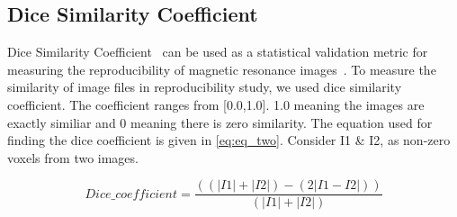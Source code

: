 \subsection{Dice Similarity Coefficient}
Dice Similarity Coefficient~\cite{ECY:ECY1945263297} can be used as a statistical validation metric for measuring the reproducibility of magnetic resonance images~\cite{Zou2004}. To measure the similarity of image files in reproducibility study, we used dice similarity coefficient. The coefficient ranges from [0.0,1.0]. 1.0 meaning the images are exactly similiar and 0 meaning there is zero similarity. The equation used for finding the dice coefficient is given in \ref{eq:eq_two}. Consider I1 \& I2, as non-zero voxels from two images.

\begin{equation}
  \label{eq:eq_two}
    Dice\_coefficient = \frac{((|I1| + |I2|) - (2|I1 - I2|))}{(|I1| + |I2|)}
\end{equation}

\iffalse
\DontPrintSemicolon
\SetKwFunction{FMain}{Convert\_image}
\SetKwProg{Fn}{Function}{:}{}
\Fn{\FMain{$image$}}{
  \begin{algorithmic}[1]
    \IF{image extension is ``.mgz":}
      \STATE convert image to ``.nii"
    \ELSE
      \STATE do nothing
    \ENDIF
  \end{algorithmic}
\KwRet image\;
}
\hfill \break
\hfill \break
\SetKwFunction{FDice}{Get\_NRMSE}
\SetKwProg{Pn}{Function}{:}{}
\Pn{\FDice{$image\-1$,$image\-2$}}{
  \begin{algorithmic}[1]
    \STATE image\_1 $\leftarrow$ Convert\_image(image\-1);
    \STATE image\_2 $\leftarrow$ Convert\_image(image\-2);
    \STATE \textbf{fslmaths} image\_1 \text{-sub} image\_2 $\rightarrow$ diff;
    \STATE nonzero\_voxels\_image1 $\leftarrow$ get the $\textless$non-zero voxels$\textgreater$ $\textless$volume$\textgreater$ from image\_1; \COMMENT{using FSL}
    \STATE nonzero\_voxels\_image2 $\leftarrow$ get the $\textless$non-zero voxels$\textgreater$ $\textless$volume$\textgreater$ from image\_2;
    \STATE nonzero\_voxels\_difference $\leftarrow$ get the $\textless$non-zero voxels$\textgreater$ $\textless$volume$\textgreater$ from difference of images;
    \STATE \textbf{Dice\_coeff} $\leftarrow$ $\frac{(nonzero\_voxels\_image1+nonzero\_voxels\_image2)-nonzero\_voxels\_difference}{(nonzero\_voxels\_image1+nonzero\_voxels\_image2)}$;
  \end{algorithmic}
\KwRet \textbf{Dice\_coeff}\;
}
\caption*{Algorithm 2: Algorithm for finding Dice coefficient similarity from images}
\label{alg:dice_algorithm}
\fi

